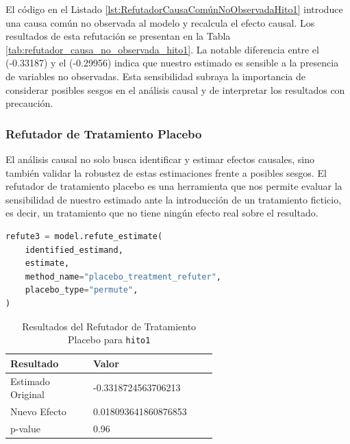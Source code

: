 El código en el Listado \ref{lst:RefutadorCausaComúnNoObservadaHito1} introduce una causa común no observada al modelo y recalcula el efecto causal. Los resultados de esta refutación se presentan en la Tabla \ref{tab:refutador_causa_no_observada_hito1}. La notable diferencia entre el  (-0.33187) y el  (-0.29956) indica que nuestro estimado es sensible a la presencia de variables no observadas. Esta sensibilidad subraya la importancia de considerar posibles sesgos en el análisis causal y de interpretar los resultados con precaución.


\subsubsection{Refutador de Tratamiento Placebo}

El análisis causal no solo busca identificar y estimar efectos causales, sino también validar la robustez de estas estimaciones frente a posibles sesgos. El refutador de tratamiento placebo es una herramienta que nos permite evaluar la sensibilidad de nuestro estimado ante la introducción de un tratamiento ficticio, es decir, un tratamiento que no tiene ningún efecto real sobre el resultado.

\begin{minipage}{0.5\textwidth}
    \begin{lstlisting}[language=Python, caption=Refutador de tratamiento placebo para \texttt{hito1}, label=lst:RefutadorTratamientoPlaceboHito1]
refute3 = model.refute_estimate(
    identified_estimand,
    estimate,
    method_name="placebo_treatment_refuter",
    placebo_type="permute",
)
\end{lstlisting}
\end{minipage}
\hfill
\begin{minipage}{0.45\textwidth}
    \begin{table}[H]
        \centering
        \begin{tabular}{lp{0.6\linewidth}}
            \toprule
            \textbf{Resultado} & \textbf{Valor} \\
            \midrule
            Estimado Original & -0.3318724563706213  \\
            Nuevo Efecto & 0.018093641860876853 \\
            p-value & 0.96 \\
            \bottomrule
        \end{tabular}
        \caption{Resultados del Refutador de Tratamiento Placebo para \texttt{hito1}}
        \label{tab:refutador_placebo_hito1}
    \end{table}
\end{minipage}

